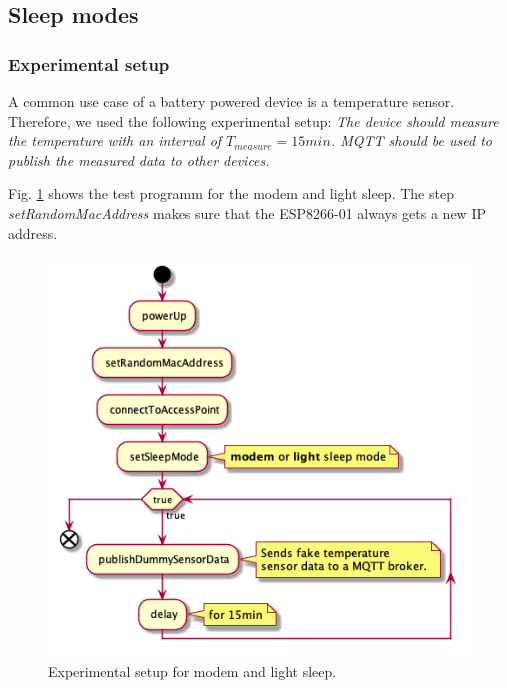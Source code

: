 \subsection{Sleep modes}

\subsubsection{Experimental setup}
A common use case of a battery powered device is a temperature sensor.
Therefore, we used the following experimental setup:
\textit{The device should measure the temperature with an interval of $T_{measure} = 15min$.
MQTT should be used to publish the measured data to other devices.}

Fig. \ref{fig:experiment_modem_light_sleep} shows the test programm for the modem and light sleep.
The step \textit{setRandomMacAddress} makes sure that the ESP8266-01 always gets a new IP address.

\begin{figure}[h]
    \centering
    \includegraphics[width = 0.7 \linewidth]{fig/sequence_modem_light_sleep.png}
    \caption{Experimental setup for modem and light sleep.}
    \label{fig:experiment_modem_light_sleep}
\end{figure}

